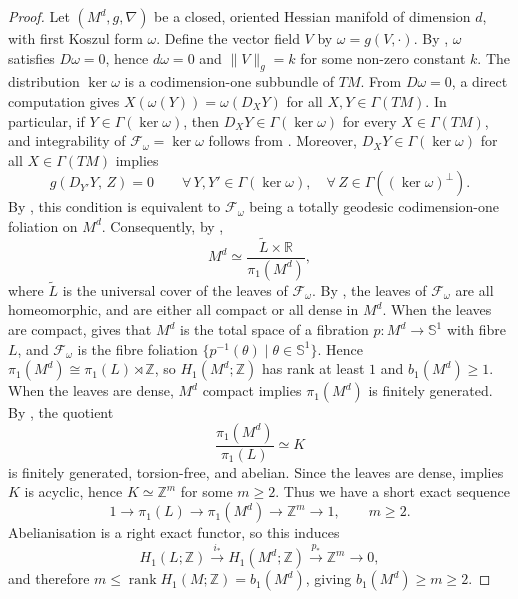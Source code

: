 \begin{proof}
Let $(M^d, g, \nabla)$ be a closed, oriented Hessian manifold of dimension $d$, with first Koszul form $\omega$. 
Define the vector field $V$ by $\omega = g(V, \cdot)$.
 By \citep[Theorem~4.1]{shima1997}, $\omega$ satisfies $D\omega = 0$, hence $d\omega = 0$ and $\|V\|_g = k$ 
 for some non-zero constant $k$. The distribution $\ker\omega$ is a codimension-one subbundle of $TM$.
  From $D\omega = 0$, a direct computation gives $X(\omega(Y)) = \omega(D_X Y)$ for all $X, Y \in \Gamma(TM)$.
   In particular, if $Y \in \Gamma(\ker\omega)$, then $D_X Y \in \Gamma(\ker\omega)$ for every $X \in \Gamma(TM)$,
  and integrability of $\mathcal{F}_\omega = \ker\omega$ follows from \citep[Lemma~1.5.1]{furness1972}.
   Moreover, $D_X Y \in \Gamma(\ker\omega)$ for all $X \in \Gamma(TM)$ implies
\[
  g(D_{Y'} Y,\, Z) = 0
  \qquad
  \forall\, Y, Y' \in \Gamma(\ker\omega),\quad \forall\, Z \in \Gamma((\ker\omega)^\perp).
\]
By \citep[Theorem~5.23]{tondeur2012}, this condition is equivalent to $\mathcal{F}_\omega$ being a totally
 geodesic codimension-one foliation on $M^d$. 
Consequently, by \citep{blumenthal1983},
\[
M^d \simeq \frac{\widetilde{L}\times \mathbb{R}}{\pi_1(M^d)},
\]
where $\widetilde{L}$ is the universal cover of the leaves of $\mathcal{F}_\omega$.
 By \citep[p.~111]{reeb1952}, the leaves of $\mathcal{F}_\omega$ are all homeomorphic, 
 and are either all compact or all dense in $M^d$. When the leaves are compact, \citep{godbillon1991,reeb1952}
  gives that $M^d$ is the total space of a fibration $p \colon M^d \to \mathbb{S}^1$ with fibre $L$, 
  and $\mathcal{F}_\omega$ is the fibre foliation $\{p^{-1}(\theta) \mid \theta \in \mathbb{S}^1\}$.
   Hence $\pi_1(M^d) \cong \pi_1(L) \rtimes \mathbb{Z}$, so $H_1(M^d;\mathbb{Z})$ has rank at least $1$ and $b_1(M^d) \ge 1$. 
   When the leaves are dense, $M^d$ compact implies $\pi_1(M^d)$ is finitely generated. By \citep[pp.~45--46]{godbillon1991}, 
   the quotient
\[
  \frac{\pi_1(M^d)}{\pi_1(L)} \simeq K
\]
is finitely generated, torsion-free, and abelian. Since the leaves are dense, \citep[p.~46]{godbillon1991}
 implies $K$ is acyclic, hence $K \simeq \mathbb{Z}^m$ for some $m \ge 2$. Thus we have a short exact sequence
\[
  1 \longrightarrow \pi_1(L) \longrightarrow \pi_1(M^d)
  \longrightarrow \mathbb{Z}^m \longrightarrow 1, \qquad m \ge 2.
\]
Abelianisation is a right exact functor, so this induces
\[
  H_1(L;\mathbb{Z}) \xrightarrow{i_*} H_1(M^d;\mathbb{Z})
  \xrightarrow{p_*} \mathbb{Z}^m \longrightarrow 0,
\]
and therefore $m \le \operatorname{rank}H_1(M;\mathbb{Z}) = b_1(M^d)$, giving $b_1(M^d) \ge m \ge 2$. 


\end{proof}
